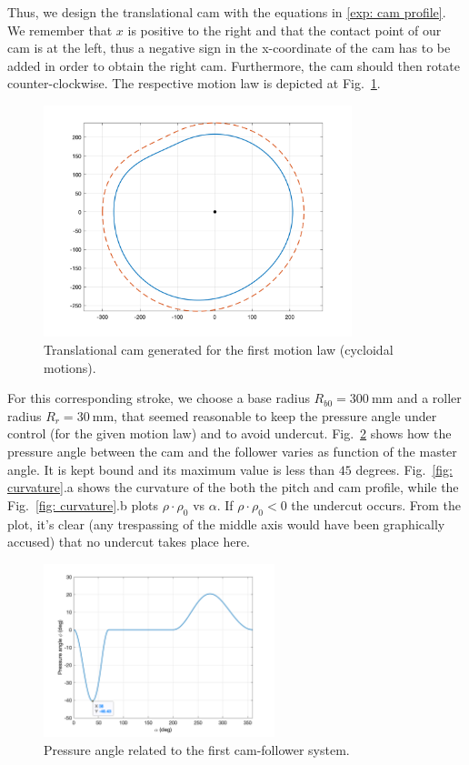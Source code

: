 \documentclass[12pt]{scrartcl}
\begin{document}
 Thus, we design the translational cam with the equations in \eqref{exp: cam profile}. We remember that $x$ is positive to the right and that the contact point of our cam is at the left, thus a negative sign in the x-coordinate of the cam has to be added in order to obtain the right cam. Furthermore, the cam should then rotate counter-clockwise. The respective motion law is depicted at Fig.~\ref{fig: transl cam}. 
\begin{figure}[htbp!]
	\centering
	\includegraphics[width = 0.8\textwidth]{Pictures/transCam}
	\caption{Translational cam generated for the first motion law (cycloidal motions).}
	\label{fig: transl cam}
\end{figure}
For this corresponding stroke, we choose a base radius $R_{b0} = \SI{300}{\milli\metre}$ and a roller radius $R_r = \SI{30}{\milli\metre}$, that seemed reasonable to keep the pressure angle under control (for the given motion law) and to avoid undercut. Fig.~\ref{fig: pressure angle} shows how the pressure angle between the cam and the follower varies as function of the master angle. It is kept bound and its maximum value is less than $45$ degrees. Fig.~\ref{fig: curvature}.a shows the curvature of the both the pitch and cam profile, while the Fig.~\ref{fig: curvature}.b plots $\rho \cdot \rho_0$ vs $\alpha$. If $\rho\cdot\rho_0 < 0$ the undercut occurs. From the plot, it's clear (any trespassing of the middle axis would have been graphically accused) that no undercut takes place here.
\begin{figure}[htbp!]
	\centering
	\includegraphics[width=0.6\textwidth]{Pictures/pressAngle}
	\caption{Pressure angle related to the first cam-follower system.}
	\label{fig: pressure angle}
\end{figure}
\end{document}
